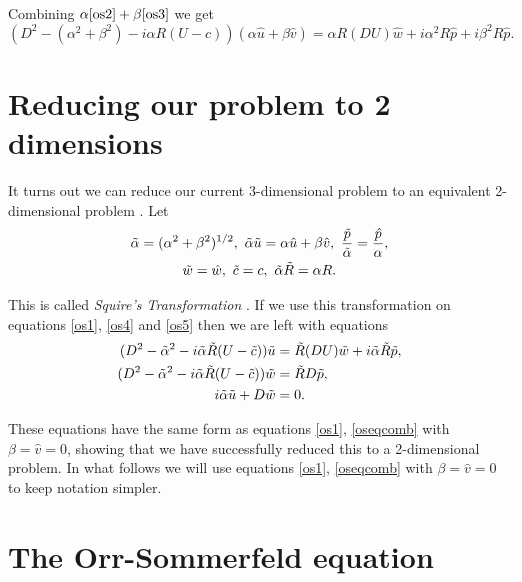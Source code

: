 Combining $ \alpha \eqref{os2} + \beta \eqref{os3} $ we get
\begin{equation}
    (D^2 - (\alpha^2+\beta^2) - i \alpha R (U - c)) (\alpha \hat{u} + \beta \hat{v}) = \alpha R (DU) \hat{w} + i \alpha^2 R \hat{p} + i \beta^2 R \hat{p}.
\label{os5}
\end{equation}

\section{Reducing our problem to 2 dimensions}

It turns out we can reduce our current 3-dimensional problem to an equivalent 2-dimensional problem \citep{drazin2004hydrodynamic}. Let
\begin{gather}
    \Tilde{\alpha} = (\alpha^2 + \beta^2)^{1/2},\ \Tilde{\alpha} \Tilde{u} = \alpha \hat{u} + \beta \hat{v},\ \frac{\Tilde{p}}{\Tilde{\alpha}} = \frac{\hat{p}}{\alpha}, \nonumber\\ \Tilde{w} = \hat{w},\ \Tilde{c} = c,\ \Tilde{\alpha} \Tilde{R} = \alpha R.
\end{gather}

This is called \emph{Squire's Transformation} \citep{squire1933stability}. If we use this transformation on equations \eqref{os1}, \eqref{os4} and \eqref{os5} then we are left with equations
\begin{subequations}
\begin{align}
    (D^2 - \Tilde{\alpha}^2 - i \Tilde{\alpha} \Tilde{R} (U - \Tilde{c}))  \Tilde{u} &= \Tilde{R} (DU) \Tilde{w} + i \Tilde{\alpha} \Tilde{R} \Tilde{p}, \label{os2d1} \\
    (D^2 - \Tilde{\alpha}^2 - i \Tilde{\alpha} \Tilde{R} (U - \Tilde{c})) \Tilde{w} &= \Tilde{R} D \Tilde{p}, \label{os2d2} \\
    i \Tilde{\alpha} \Tilde{u} + D \Tilde{w} &= 0. \label{os2d3}
\end{align} \label{equationstoreduce}
\end{subequations}

These equations have the same form as equations \eqref{os1}, \eqref{oseqcomb} with $ \beta = \hat{v} = 0 $, showing that we have successfully reduced this to a 2-dimensional problem. In what follows we will use equations \eqref{os1}, \eqref{oseqcomb} with $ \beta = \hat{v} = 0$ to keep notation simpler.

\section{The Orr-Sommerfeld equation}

